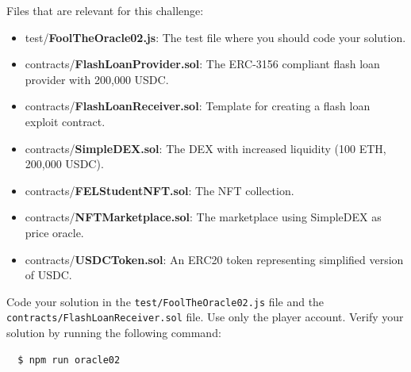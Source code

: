 \documentclass[12pt]{article}
\begin{document}
Files that are relevant for this challenge:
\begin{itemize}
\item test/\textbf{FoolTheOracle02.js}: The test file where you should code your solution.
\item contracts/\textbf{FlashLoanProvider.sol}: The ERC-3156 compliant flash loan provider with 200,000 USDC.
\item contracts/\textbf{FlashLoanReceiver.sol}: Template for creating a flash loan exploit contract.
\item contracts/\textbf{SimpleDEX.sol}: The DEX with increased liquidity (100 ETH, 200,000 USDC).
\item contracts/\textbf{FELStudentNFT.sol}: The NFT collection.
\item contracts/\textbf{NFTMarketplace.sol}: The marketplace using SimpleDEX as price oracle.
\item contracts/\textbf{USDCToken.sol}: An ERC20 token representing simplified version of USDC.
\end{itemize}

\noindent
Code your solution in the \texttt{test/FoolTheOracle02.js} file and the \\ \texttt{contracts/FlashLoanReceiver.sol} file. Use only the player account. Verify your solution by running the following command:

\begin{verbatim}
  $ npm run oracle02
\end{verbatim}
\end{document}
